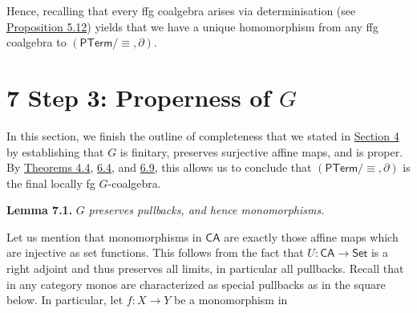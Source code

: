\par\medskip
\hypertarget{html:S6.SSx1.p6}{} Hence, recalling that every ffg coalgebra arises via determinisation (see \hyperlink{html:S5.Thmtheorem12}{Proposition 5.12}) yields that we have a unique homomorphism from any ffg coalgebra to %
\hypertarget{html:S6.SSx1.p6.m1}{}\({(\mathsf{PTerm}/{\equiv},\partial)}\).
\par\medskip
   
%
\hypertarget{html:S7}{} %
\hypertarget{html:S7.m1}{}\section*{7 Step 3: Properness of \({G}\)}
\hypertarget{html:S7.p1}{} In this section, we finish the outline of completeness that we stated in \hyperlink{html:S4}{Section 4} by establishing that %
\hypertarget{html:S7.p1.m1}{}\({G}\) is finitary, preserves surjective affine maps, and is proper. By \hyperlink{html:S4.Thmtheorem4}{Theorems 4.4}, \hyperlink{html:S6.Thmtheorem4}{6.4}, and \hyperlink{html:S6.Thmtheorem9}{6.9}, this allows us to conclude that %
\hypertarget{html:S7.p1.m2}{}\({(\mathsf{PTerm}/{\equiv},\partial)}\) is the final locally fg %
\hypertarget{html:S7.p1.m3}{}\({G}\)-coalgebra.
\par\medskip
\hypertarget{html:S7.Thmtheorem1}{} \par\noindent\textbf{\textbf{Lemma 7.1}\textbf{.}}\quad  %
\hypertarget{html:S7.Thmtheorem1.p1}{} %
\hypertarget{html:S7.Thmtheorem1.p1.m1}{}\({G}\)\emph{ preserves pullbacks, and hence monomorphisms.}
\par\medskip
\hypertarget{html:S7.p2}{} Let us mention that monomorphisms in %
\hypertarget{html:S7.p2.m1}{}\({\mathsf{CA}}\) are exactly those affine maps which are injective as set functions. This follows from the fact that %
\hypertarget{html:S7.p2.m2}{}\({U\colon\mathsf{CA}\to\mathsf{Set}}\) is a right adjoint and thus preserves all limits, in particular all pullbacks. Recall that in any category monos are characterized as special pullbacks as in the square below. In particular, let %
\hypertarget{html:S7.p2.m3}{}\({f:X\to Y}\) be a monomorphism in %
